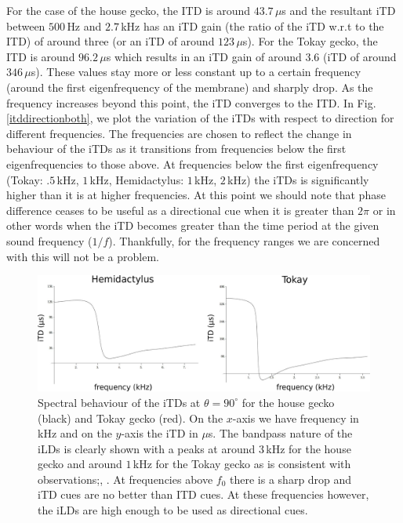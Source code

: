 For the case of the house gecko, the ITD is around $43.7\,\mu$s and the resultant iTD between 
$500\,$Hz and $2.7\,$kHz has an iTD gain (the ratio of the iTD  w.r.t to the ITD)  of around three (or an iTD of around $123\,\mu$s). For the Tokay gecko, the ITD is around $96.2\,\mu$s which results in an iTD
gain of around $3.6$ (iTD of around $346\,\mu$s). These values stay more or less constant up to a certain frequency (around the first eigenfrequency of the membrane) and
sharply drop. As the frequency increases beyond this point, the iTD converges to the ITD. In Fig. \ref{itddirectionboth}, we plot the variation of the iTDs
with respect to direction for different frequencies. The frequencies are chosen to reflect the change in behaviour of the iTDs as it transitions from frequencies
below the first eigenfrequencies to those above. At frequencies below the first eigenfrequency (Tokay: $.5\,$kHz, $1\,$kHz, Hemidactylus: $1\,$kHz, $2\,$kHz) the iTDs
is significantly higher than it is at higher frequencies. At this point we should note that phase difference ceases to be useful as a directional cue when it is
greater than $2\pi$ or in other words when the iTD becomes greater than the time period at the given sound frequency ($1/f$). Thankfully, for the frequency ranges we are concerned with this will not be a problem.

\begin{figure}[ht!]
\centering
  \includegraphics[width=1.0\linewidth]{Diagrams/Plots/iTD/both.png}
  \caption[Spectral behavior of the iTDs.]{Spectral behaviour of the iTDs at $\theta=90^\circ$ for the house gecko (black) and Tokay gecko (red). On the $x$-axis we have frequency in kHz and on the $y$-axis the iTD in $\mu$s.
  The bandpass nature of the iLDs is clearly shown with a peaks at around $3\,$kHz for the house gecko and around $1\,$kHz for the Tokay gecko as is consistent with observations;\cite{dalsgaardmanley1}, \cite{dalsgaardmanley2}.
  At frequencies above $f_0$ there is a sharp drop and iTD cues are no better than ITD cues. At these frequencies however, the iLDs are high enough to be used as directional cues.}
  \label{iTDboth}
\end{figure}

